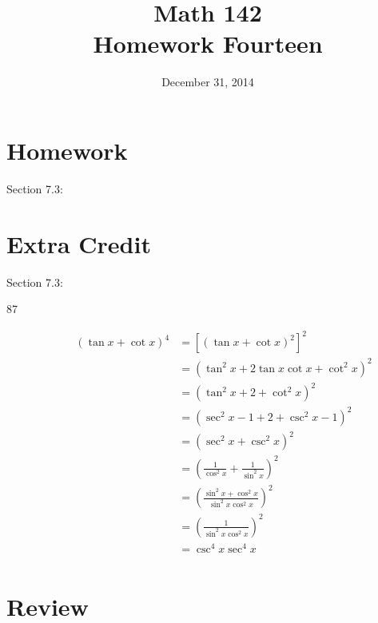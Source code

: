 \documentclass{exam}
\author{}
\date{December 31, 2014}
\title{Math 142 \\ Homework Fourteen}
\begin{document}
  \maketitle

  \section{Homework}
  Section 7.3:

  \section{Extra Credit}
  Section 7.3: 

  \ifprintanswers
    \pagebreak
    \begin{description}

      \item[87] 
        \begin{align*}
          (\tan x + \cot x)^4 & = \left[ (\tan x + \cot x)^2 \right]^2 \\
                              & = \left( \tan^2 x + 2 \tan x \cot x + \cot^2 x \right)^2 \\
                              & = \left( \tan^2 x + 2 + \cot^2 x \right)^2 \\
                              & = \left( \sec^2 x - 1 + 2 + \csc^2 x - 1 \right)^2 \\
                              & = \left( \sec^2 x + \csc^2 x \right)^2 \\
                              & = \left( \frac{1}{\cos^2 x} + \frac{1}{\sin^2 x} \right)^2 \\
                              & = \left( \frac{\sin^2 x + \cos^2 x}{\sin^2 x \cos^2 x} \right)^2 \\
                              & = \left( \frac{1}{\sin^2 x \cos^2 x} \right)^2 \\
                              & = \csc^4 x \sec^4 x \\
        \end{align*}

    \end{description}
  \fi

  \section{Review}

  \ifprintanswers
\end{document}

